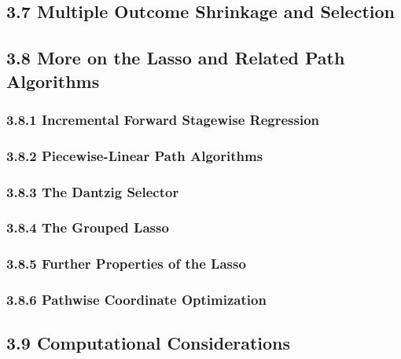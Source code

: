 \documentclass[11pt]{article}
\begin{document}
\subsection{3.7 Multiple Outcome Shrinkage and
Selection}\label{multiple-outcome-shrinkage-and-selection}

\subsection{3.8 More on the Lasso and Related Path
Algorithms}\label{more-on-the-lasso-and-related-path-algorithms}

\subsubsection{3.8.1 Incremental Forward Stagewise
Regression}\label{incremental-forward-stagewise-regression}

\subsubsection{3.8.2 Piecewise-Linear Path
Algorithms}\label{piecewise-linear-path-algorithms}

\subsubsection{3.8.3 The Dantzig Selector}\label{the-dantzig-selector}

\subsubsection{3.8.4 The Grouped Lasso}\label{the-grouped-lasso}

\subsubsection{3.8.5 Further Properties of the
Lasso}\label{further-properties-of-the-lasso}

\subsubsection{3.8.6 Pathwise Coordinate
Optimization}\label{pathwise-coordinate-optimization}

\subsection{3.9 Computational
Considerations}\label{computational-considerations}
\end{document}
